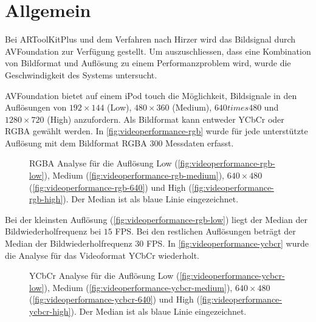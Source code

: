 \section{Allgemein} %
\label{sec:allgemein}

Bei ARToolKitPlus und dem Verfahren nach Hirzer wird das Bildsignal durch AVFoundation zur Verfügung gestellt. Um
 auszuschliessen, dass eine Kombination von Bildformat und Auflösung zu einem Performanzproblem wird, wurde die
 Geschwindigkeit des Systems untersucht.

AVFoundation bietet auf einem iPod touch die Möglichkeit, Bildsignale in den Auflösungen von $192 \times 144$ (Low),
 $480 \times 360$ (Medium), $640 times 480$ und $1280 \times 720$ (High) anzufordern. Als Bildformat kann entweder
 YCbCr oder RGBA gewählt werden. In \autoref{fig:videoperformance-rgb} wurde für jede unterstützte
 Auflösung mit dem Bildformat RGBA $300$ Messdaten erfasst.
\begin{figure}[!ht]
	\centering
	\caption{RGBA Analyse für die Auflösung Low (\autoref{fig:videoperformance-rgb-low}),
	 Medium (\autoref{fig:videoperformance-rgb-medium}), $640 \times 480$ (\autoref{fig:videoperformance-rgb-640}) und
	 High (\autoref{fig:videoperformance-rgb-high}). Der Median ist als blaue Linie eingezeichnet.}
	\label{fig:videoperformance-rgb}
\end{figure}
Bei der kleinsten Auflösung (\autoref{fig:videoperformance-rgb-low}) liegt der Median der Bildwiederholfrequenz bei $15$
 FPS. Bei den restlichen Auflösungen beträgt der Median der Bildwiederholfrequenz $30$ FPS. In
 \autoref{fig:videoperformance-ycbcr} wurde die Analyse für das Videoformat YCbCr wiederholt.
\begin{figure}[!ht]
	\centering
	\caption{YCbCr Analyse für die Auflösung Low (\autoref{fig:videoperformance-ycbcr-low}),
	 Medium (\autoref{fig:videoperformance-ycbcr-medium}), $640 \times 480$ (\autoref{fig:videoperformance-ycbcr-640})
	 und High (\autoref{fig:videoperformance-ycbcr-high}). Der Median ist als blaue Linie eingezeichnet.}
	\label{fig:videoperformance-ycbcr}
\end{figure}
